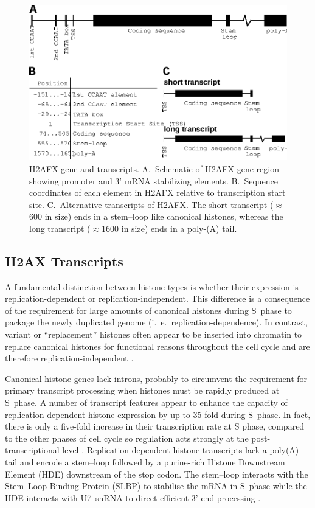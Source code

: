 \begin{figure}
\includegraphics{h2ax-review/figs/Fig2}
\caption[H2AFX gene and transcripts]%
        {H2AFX gene and transcripts. A.~Schematic of H2AFX gene region
          showing promoter and 3' mRNA stabilizing
          elements. B.~Sequence coordinates of each element in H2AFX
          relative to transcription start site\@. C.~Alternative
          transcripts of H2AFX\@. The short transcript
          ($\approx$\SI{600}{\bp} in size) ends in a stem--loop like
          canonical histones, whereas the long transcript
          ($\approx$\SI{1600}{\bp} in size) ends in a poly-(A) tail.}
\label{fig:h2ax-review:H2AFX}
\end{figure}

\subsection{H2AX Transcripts}
A fundamental distinction between histone types is whether their
expression is replication-dependent or replication-independent. This
difference is a consequence of the requirement for large amounts of
canonical histones during S~phase to package the newly duplicated
genome (i.~e.\ replication-dependence).
In contrast, variant or ``replacement'' histones often appear to be
inserted into chromatin to replace canonical histones for functional
reasons throughout the cell cycle and are therefore
replication-independent \citep{WFM+02}.

Canonical histone genes lack introns, probably to circumvent the
requirement for primary transcript processing when histones must be
rapidly produced at S~phase. A number of transcript features appear to
enhance the capacity of replication-dependent histone expression by up
to 35-fold during S~phase.  In fact, there is only a five-fold
increase in their transcription rate at S phase, compared to the other
phases of cell cycle so regulation acts strongly at the
post-transcriptional level \citep{MEH+91}.
Replication-dependent histone transcripts lack a poly(A) tail and
encode a stem--loop followed by a purine-rich Histone Downstream
Element (HDE) downstream of the stop codon. The stem--loop interacts
with the Stem--Loop Binding Protein (SLBP) to stabilise the mRNA in
S~phase \citep{MLW+00} while the HDE interacts with U7~snRNA to direct
efficient 3' end processing \citep{GB85}.

